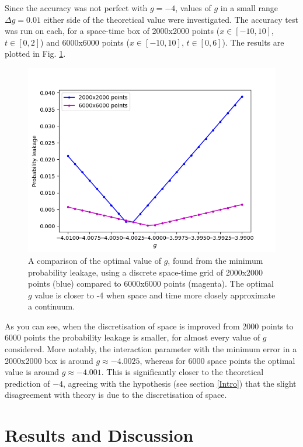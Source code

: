 \documentclass[10pt, twocolumn]{revtex4}    %
\begin{document}
Since the accuracy was not perfect with $g=-4$, values of $g$ in a small range $\Delta g = 0.01$ either side of the theoretical value were investigated. The accuracy test was run on each, for a space-time box of 2000x2000 points ($x \in [-10,10]$, $t \in [0,2]$) and 6000x6000 points ($x \in [-10,10]$, $t \in [0,6]$). The results are plotted in Fig. \ref{errorsfig}. 

\begin{figure}[h] 
\includegraphics[width=\columnwidth]{errors.png}
\caption{A comparison of the optimal value of $g$, found from the minimum probability leakage, using a discrete space-time grid of 2000x2000 points (blue) compared to 6000x6000 points (magenta). The optimal $g$ value is closer to -4 when space and time more closely approximate a continuum.}
\label{errorsfig}
\end{figure}

As you can see, when the discretisation of space is improved from 2000 points to 6000 points the probability leakage is smaller, for almost every value of $g$ considered. More notably, the interaction parameter with the minimum error in a 2000x2000 box is around $g \approx -4.0025$, whereas for 6000 space points the optimal value is around $g \approx -4.001$. This is significantly closer to the theoretical prediction of $-4$, agreeing with the hypothesis (see section \ref{Intro}) that the slight disagreement with theory is due to the discretisation of space.



\section{Results and Discussion} \label{Results}
\end{document}
